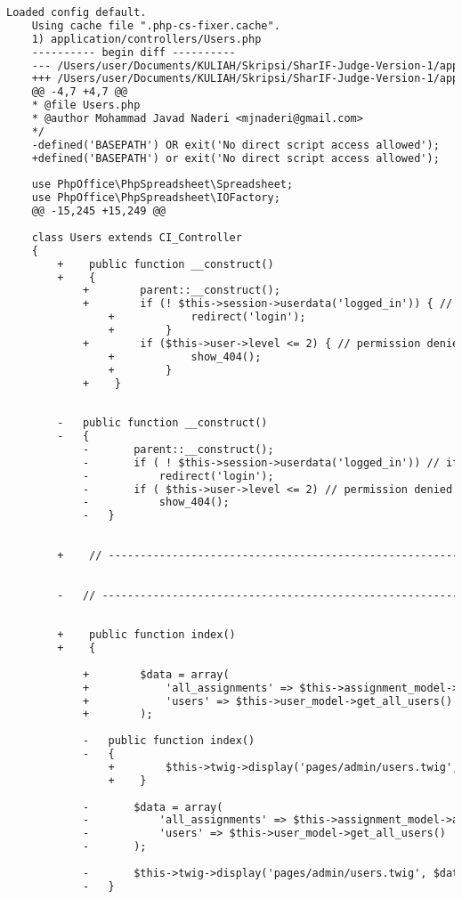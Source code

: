 \begin{lstlisting}[language=diff, caption=Perubahan pada kode Users.php]
	Loaded config default.
	Using cache file ".php-cs-fixer.cache".
	1) application/controllers/Users.php
	---------- begin diff ----------
	--- /Users/user/Documents/KULIAH/Skripsi/SharIF-Judge-Version-1/application/controllers/Users.php
	+++ /Users/user/Documents/KULIAH/Skripsi/SharIF-Judge-Version-1/application/controllers/Users.php
	@@ -4,7 +4,7 @@
	* @file Users.php
	* @author Mohammad Javad Naderi <mjnaderi@gmail.com>
	*/
	-defined('BASEPATH') OR exit('No direct script access allowed');
	+defined('BASEPATH') or exit('No direct script access allowed');
	
	use PhpOffice\PhpSpreadsheet\Spreadsheet;
	use PhpOffice\PhpSpreadsheet\IOFactory;
	@@ -15,245 +15,249 @@
	
	class Users extends CI_Controller
	{
		+    public function __construct()
		+    {
			+        parent::__construct();
			+        if (! $this->session->userdata('logged_in')) { // if not logged in
				+            redirect('login');
				+        }
			+        if ($this->user->level <= 2) { // permission denied
				+            show_404();
				+        }
			+    }
		
		
		-	public function __construct()
		-	{
			-		parent::__construct();
			-		if ( ! $this->session->userdata('logged_in')) // if not logged in
			-			redirect('login');
			-		if ( $this->user->level <= 2) // permission denied
			-			show_404();
			-	}
		
		
		+    // ------------------------------------------------------------------------
		
		
		-	// ------------------------------------------------------------------------
		
		
		+    public function index()
		+    {
			
			+        $data = array(
			+            'all_assignments' => $this->assignment_model->all_assignments(),
			+            'users' => $this->user_model->get_all_users()
			+        );
			
			-	public function index()
			-	{
				+        $this->twig->display('pages/admin/users.twig', $data);
				+    }
			
			-		$data = array(
			-			'all_assignments' => $this->assignment_model->all_assignments(),
			-			'users' => $this->user_model->get_all_users()
			-		);
			
			-		$this->twig->display('pages/admin/users.twig', $data);
			-	}
		

\end{lstlisting}
